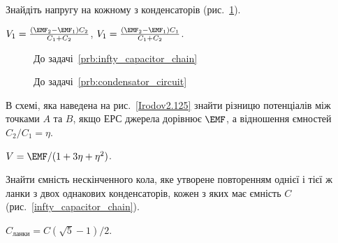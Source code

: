 \begin{problem}\label{prb:condensator_circuit}
    Знайдіть напругу на кожному з конденсаторів (рис.~\ref{condensator_circuit}).
\begin{solution}
	$V_1 = \frac{(\EMF_2 - \EMF_1) C_2}{C_1 + C_2}$, $V_1 = \frac{(\EMF_2 - \EMF_1) C_1}{C_1 + C_2}$.
\end{solution}
\end{problem}
\begin{figure}[h!]\centering
\begin{minipage}[t]{0.45\linewidth}\centering
{}
\caption{До задачі~\ref{prb:infty_capacitor_chain}}
\label{section_of_circuin_with_condensators}
\end{minipage}
\begin{minipage}[t]{0.45\linewidth}\centering
\caption{До задачі~\ref{prb:condensator_circuit}}
\label{condensator_circuit}
\end{minipage}
\end{figure}
\begin{problem}\label{prb:Irodov2.125}
В схемі, яка наведена на рис.~\ref{Irodov2.125} знайти різницю потенціалів між точками $A$ та $B$, якщо ЕРС джерела дорівнює $\EMF$, а відношення ємностей $C_2/C_1 = \eta$.
\begin{solution}
	$V = \EMF/ (1 + 3\eta + \eta^2)$.
\end{solution}
\end{problem}

\begin{problem}\label{prb:infty_capacitor_chain}
Знайти ємність нескінченного кола, яке утворене повторенням однієї і тієї ж ланки з двох однакових конденсаторів, кожен з яких має ємність $C$ (рис.~\ref{infty_capacitor_chain}).
\begin{solution}
	$C_\text{ланки} = C \left( \sqrt5 -1 \right)/2$.
\end{solution}
\end{problem}

